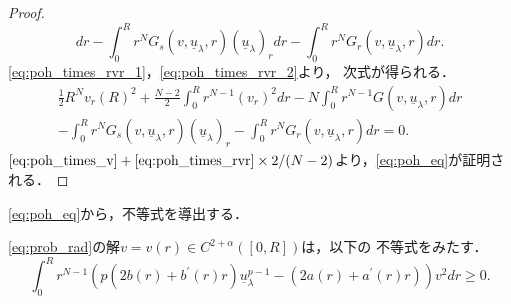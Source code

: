 \begin{proof}
\begin{equation}
   dr 
   - \int_0^R r^N 
   G_s(v, \underline{u}_\lambda, r)(\underline{u}_\lambda)_r dr
   - \int_0^R r^N G_r(v,
   \underline{u}_\lambda, r) dr
   . \label{eq:poh_times_rvr_2}
 \end{equation}
 \eqref{eq:poh_times_rvr_1}，\eqref{eq:poh_times_rvr_2}より，
 次式が得られる．
 \begin{multline}
  \frac{1}{2} R^N v_r(R)^2 + \frac{N-2}{2}\int_0^R r^{N-1} (v_r)^2
   dr -N \int_0^R r^{N-1} G(v, \underline{u}_\lambda, r)
   dr \\ - \int_0^R r^N G_s(v, \underline{u}_\lambda, r)
  (\underline{u}_\lambda)_r    - \int_0^R r^N G_r(v,
   \underline{u}_\lambda, r) dr = 0. \label{eq:poh_times_rvr}
 \end{multline}
 $\text{\eqref{eq:poh_times_v}} + \text{\eqref{eq:poh_times_rvr}} \times
 2/(N-2)$より，\eqref{eq:poh_eq}が証明される．\qedhere
\end{proof}

\eqref{eq:poh_eq}から，不等式を導出する．

\begin{lem}
 \eqref{eq:prob_rad}の解$v = v(r) \in C^{2+\alpha}([0, R])$は，以下の
 不等式をみたす．
 \begin{equation}
  \int_0^R r^{N-1} \left( p(2b(r) + b^\prime(r) r)
                    \underline{u}_\lambda^{p-1} 
                    - (2a(r) + a^\prime(r) r) \right) v^2 dr \geq 0.
  \label{eq:poh_ineq}
 \end{equation}
\end{lem}

